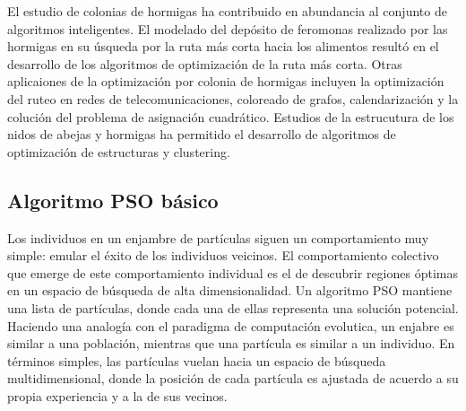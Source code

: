 \documentclass{article}
\begin{document}
El estudio de colonias de hormigas ha contribuido en abundancia al conjunto de algoritmos inteligentes.
El modelado del depósito de feromonas realizado por las hormigas en su úsqueda por la ruta más corta hacia los alimentos resultó en el desarrollo de los algoritmos de optimización de la ruta más corta.
Otras aplicaiones de la optimización por colonia de hormigas incluyen la optimización del ruteo en redes de telecomunicaciones, coloreado de grafos, calendarización y la colución del problema de asignación cuadrático.
Estudios de la estrucutura de los nidos de abejas y hormigas ha permitido el desarrollo de algoritmos de optimización de estructuras y clustering.




\subsection{Algoritmo PSO básico}
Los individuos en un enjambre de partículas siguen un comportamiento muy simple: emular el éxito de los individuos veicinos.
El comportamiento colectivo que emerge de este comportamiento individual es el de descubrir regiones óptimas en un espacio de búsqueda de alta dimensionalidad.
Un algoritmo PSO mantiene una lista de partículas, donde cada una de ellas representa una solución potencial.
Haciendo una analogía con el paradigma de computación evolutica, un enjabre es similar a una población, mientras que una partícula es similar a un individuo.
En términos simples, las partículas vuelan hacia un espacio de búsqueda multidimensional, donde la posición de cada partícula es ajustada de acuerdo a su propia experiencia y a la de sus vecinos.
\end{document}

